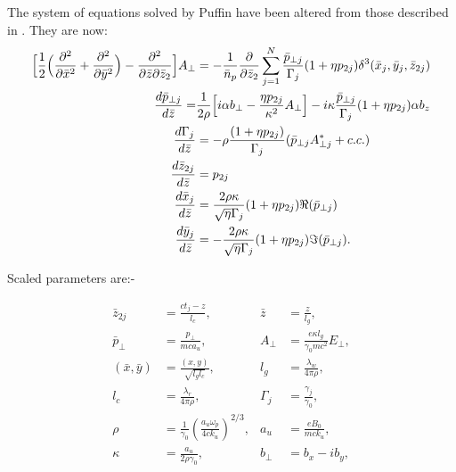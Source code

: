 \documentclass[12pt]{article}%
\begin{document}
\label{puff-eqns}

The system of equations solved by Puffin have been altered from those described in \cite{puffin}. They are now:
\begin{align}
\Bigl[\frac{1}{2}\Bigl(\frac{\partial^2}{\partial\bar{x}^2} + \frac{\partial^2}{\partial\bar{y}^2}\Bigr) -  \frac{\partial^2}{\partial\bar{z}\partial\bar{z}_2}\Bigr]A_{\bot}  & = -\frac{1}{\bar{n}_p}\frac{\partial}{\partial \bar{z}_2}\sum_{j=1}^{N} \frac{\bar{p}_{\bot j}}{\Gamma_j} (1+\eta p_{2j})     \delta^3(\bar{x}_j,\bar{y}_j,\bar{z}_{2j})  \label{fieldeq2} \\
\frac{d \bar{p}_{\bot j}}{d \bar{z}} = & \frac{1}{2\rho}\Bigl[ i \alpha b_{\bot} - \frac{\eta p_{2j}}{\kappa^2}A_{\bot} \Bigr] - i\kappa \frac{ \bar{p}_{\bot j}}{\Gamma_j} (1 + \eta p_{2j})  \alpha b_z \label{pperpeqn2} \\
\frac{d \Gamma_{j}}{d \bar{z}} &= - \rho \frac{(1 + \eta p_{2j})}{\Gamma_j} (\bar{p}_{\bot j} A^*_{\bot j} + c.c.)  \label{gameqn} \\
\frac{d\bar{z}_{2j}}{d\bar{z}}& = p_{2j}  \label{z2eqgen2} \\
\frac{d\bar{x}_j}{d\bar{z}} &=  \frac{2 \rho \kappa}{\sqrt{\eta} \Gamma_j} (1 + \eta p_{2j}) \Re(\bar{p}_{\bot j}) \label{xeqgen2} \\
\frac{d\bar{y}_j}{d\bar{z}} &= - \frac{2 \rho \kappa}{\sqrt{\eta} \Gamma_j}  (1 + \eta p_{2j}) \Im(\bar{p}_{\bot j}). \label{yeqgen2}
\end{align}



Scaled parameters are:-






\begin{align}
\bar{z}_{2j} &= \frac{ct_j - z}{l_c}, &\bar{z} &= \frac{z}{l_g}, \nonumber \\
\bar{p}_{\bot} &= \frac{p_{\bot}}{mc a_u},
&A_{\bot}&=\frac{e \kappa l_g}{\gamma_0 mc^2 }E_{\bot}, \nonumber \\
(\bar{x},\bar{y}) &= \frac{(x,y)}{\sqrt{l_g l_c}}, &l_g &= \frac{\lambda_w}{4\pi\rho}, \nonumber \\
l_c &= \frac{\lambda_r}{4\pi\rho}, & \Gamma_j& = \frac{\gamma_j}{\gamma_0}, \nonumber \\
\rho &=\frac{1}{\gamma_0}\left(\frac{a_u \omega_p}{4ck_u}\right)^{2/3},
&a_u & =\frac{eB_0}{mck_u}, \nonumber \\
\kappa & = \frac{a_u}{2 \rho \gamma_0}, & b_{\bot} & = b_x - i b_y, \nonumber
\end{align}
\end{document}
